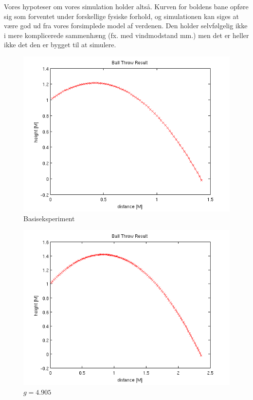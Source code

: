 Vores hypoteser om vores simulation holder altså. Kurven for boldens bane opføre sig som forventet
under forskellige fysiske forhold, og simulationen kan siges at være god ud fra vores forsimplede
model af verdenen. Den holder selvfølgelig ikke i mere komplicerede sammenhæng (fx. med vindmodstand mm.)
men det er heller ikke det den er bygget til at simulere.

\begin{figure}
\centering
\includegraphics[scale=0.75]{basisrun}
\caption{Basiseksperiment\label{basis}}
\end{figure}

\begin{figure}
\centering
\includegraphics[scale=0.75]{lessgravity}
\caption{$g = 4.905$ \label{lessg}}
\end{figure}

